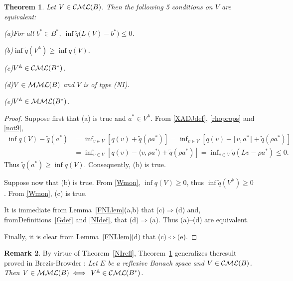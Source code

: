 \documentclass[letterpaper]{article}
\theoremstyle{plain}
\newtheorem{theorem}{Theorem}[section]
\theoremstyle{definition}
\newtheorem{remark}[theorem]{Remark}
\numberwithin{equation}{section}
\newcommand{\A}{{\mathbb A}}
\newcommand{\bra}[2]{\langle#1,#2\rangle}
\newcommand{\CML}{{\cal CML}}
\newcommand{\infn}{\inf\nolimits}
\newcommand{\lr}{\Longrightarrow}
\newcommand{\MML}{{\cal MML}}
\newcommand{\qt}{\wt q}
\newcommand{\wt}{\widetilde}
\newcommand{\xbra}[2]{\lfloor#1,#2\rfloor}
\newcommand{\Defs}{Definitions~\ref}
\newcommand{\Lem}{Lemma~\ref}
\newcommand{\Rem}{Remark~\ref}
\newcommand{\Sec}{Section~\ref}
\newcommand{\Thm}{Theorem~\ref}
\begin{document}
\begin{theorem}\label{qqthm}
Let $V \in \CML(B)$.   Then the following 5 conditions on $V$ are equivalent:
\par\noindent
{\rm(a)}\enspace For all $b^* \in B^*$, $\infn\qt\big(L(V) - b^*\big) \le 0$.\par\noindent
{\rm(b)}\enspace $\infn \qt(V^\A) \ge \infn q(V)$.\par\noindent
{\rm(c)}\enspace $V^\A \in \CML(B^*)$.\par\noindent
{\rm(d)}\enspace $V \in \MML(B)$ and $V$ is of type (NI).\par\noindent 
{\rm(e)}\enspace $V^\A \in \MML(B^*)$.
\end{theorem}
\begin{proof}
Suppose first that (a) is true and $a^* \in V^\A$.   From \eqref{XADJdef}, \eqref{rhoprops} and \eqref{not9},
%
\begin{align*}
\inf q(V) - \qt(a^*) &=\infn_{v \in V}[q(v) + \qt(\rho a^*)]
= \infn_{v \in V}[q(v) - \xbra{v}{a^*} + \qt(\rho a^*)]\\
&= \infn_{v \in V}[q(v) - \bra{v}{\rho a^*} + \qt(\rho a^*)]  = \infn_{v \in V}\qt(Lv - \rho a^*) \le 0.
\end{align*}
%
Thus $\qt(a^*) \ge \inf q(V)$.  Consequently, (b) is true.\par
Suppose now that (b) is true.   From \eqref{Wmon}, $\infn q(V) \ge 0$, thus $\infn \qt(V^\A) \ge 0$.  From \eqref{Wmon}, (c) is true.
\par
It is immediate from \Lem{FNLlem}(a,b) that (c)$\lr$(d) and, from\break \Defs{Gdef} and \ref{NIdef}, that (d)$\lr$(a).   Thus (a)--(d) are equivalent.
\par
Finally, it is clear from \Lem{FNLlem}(d) that (c)$\iff$(e).  
\end{proof}
\begin{remark}\label{BBrem}
By virtue of \Thm{NIrefl}, \Thm{qqthm} generalizes the\break result proved in Brezis-Browder \cite[Theorem 2]{BB}: {\em Let $E$ be a reflexive Banach space and $V \in \CML(B)$.   Then $V \in \MML(B) \iff$  $V^\A \in \CML(B^*)$.}
\end{remark}
\end{document}
